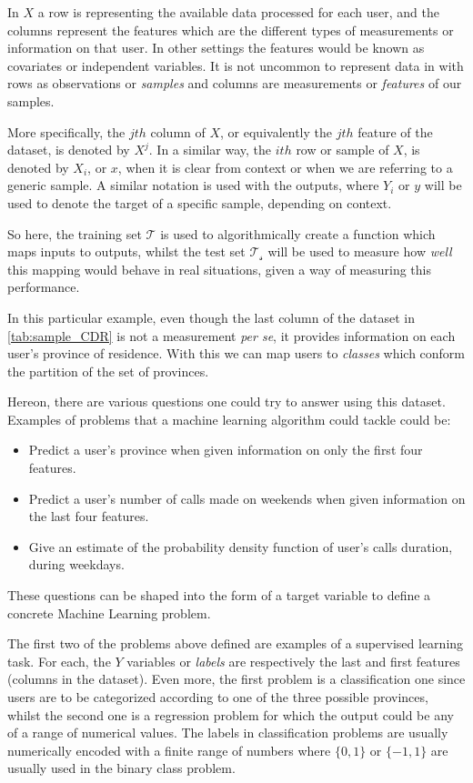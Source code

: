 In $X$ a row is representing the available data processed for each user, and the columns represent the features which are the different types of measurements or information on that user.
In other settings the features would be known as covariates or independent variables.
It is not uncommon to represent data in with rows as observations or \textit{samples} and columns are measurements or \textit{features} of our samples.

More specifically, the $jth$ column of $X$, or equivalently the $jth$ feature of the dataset, is denoted by $X^j$.
In a similar way, the $ith$ row or sample of $X$, is denoted by $X_i$, or $x$, when it is clear from context or when we are referring to a generic sample.
A similar notation is used with the outputs, where $Y_i$ or $y$ will be used to denote the target of a specific sample, depending on context.

So here, the training set $\mathcal{T}$ is used to algorithmically create a function which maps inputs to outputs,  whilst the test set $\mathcal{T_s}$ will be used to measure how \textit{well} this mapping would behave in real situations, given a way of measuring this performance.

In this particular example, even though the last column of the dataset in \cref{tab:sample_CDR} is not a measurement \textit{per se}, it provides information on each user's province of residence.
With this we can map users to \textit{classes} which conform the partition of the set of provinces.

Hereon, there are various questions one could try to answer using this dataset.
Examples of problems that a machine learning algorithm could tackle could be:
\begin{itemize}
\item Predict a user's province when given information on only the first four features.
\item Predict a user's number of calls made on weekends when given information on the last four features.
\item Give an estimate of the probability density function of user's calls duration, during weekdays.
\end{itemize}

These questions can be shaped into the form of a target variable to define a concrete Machine Learning problem.

The first two of the problems above defined are examples of a supervised learning task.
For each, the $Y$ variables or \textit{labels} are respectively the last and first features (columns in the dataset).
Even more, the first problem is a classification one since users are to be categorized according to one of the three possible provinces, whilst the second one is a regression problem for which the output could be any of a range of numerical values.
The labels in classification problems are usually numerically encoded with a finite range of numbers where $\{0,1\}$ or $\{-1,1\}$ are usually used in the binary class problem.

